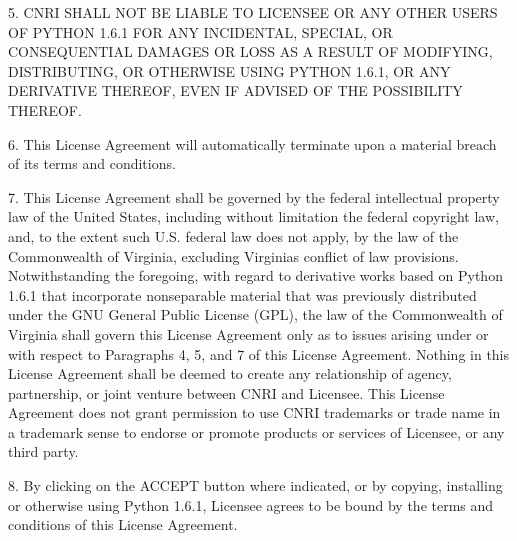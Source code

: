 \documentclass[a4,10pt,spanish]{sphinxmanual}
\begin{document}
\begin{sphinxVerbatim}[commandchars=\\\{\}]
5. CNRI SHALL NOT BE LIABLE TO LICENSEE OR ANY OTHER USERS OF PYTHON 1.6.1 FOR
   ANY INCIDENTAL, SPECIAL, OR CONSEQUENTIAL DAMAGES OR LOSS AS A RESULT OF
   MODIFYING, DISTRIBUTING, OR OTHERWISE USING PYTHON 1.6.1, OR ANY DERIVATIVE
   THEREOF, EVEN IF ADVISED OF THE POSSIBILITY THEREOF.

6. This License Agreement will automatically terminate upon a material breach of
   its terms and conditions.

7. This License Agreement shall be governed by the federal intellectual property
   law of the United States, including without limitation the federal copyright
   law, and, to the extent such U.S. federal law does not apply, by the law of the
   Commonwealth of Virginia, excluding Virginia\PYGZsq{}s conflict of law provisions.
   Notwithstanding the foregoing, with regard to derivative works based on Python
   1.6.1 that incorporate non\PYGZhy{}separable material that was previously distributed
   under the GNU General Public License (GPL), the law of the Commonwealth of
   Virginia shall govern this License Agreement only as to issues arising under or
   with respect to Paragraphs 4, 5, and 7 of this License Agreement.  Nothing in
   this License Agreement shall be deemed to create any relationship of agency,
   partnership, or joint venture between CNRI and Licensee.  This License Agreement
   does not grant permission to use CNRI trademarks or trade name in a trademark
   sense to endorse or promote products or services of Licensee, or any third
   party.

8. By clicking on the \PYGZdq{}ACCEPT\PYGZdq{} button where indicated, or by copying, installing
   or otherwise using Python 1.6.1, Licensee agrees to be bound by the terms and
   conditions of this License Agreement.
\end{sphinxVerbatim}
\end{document}
